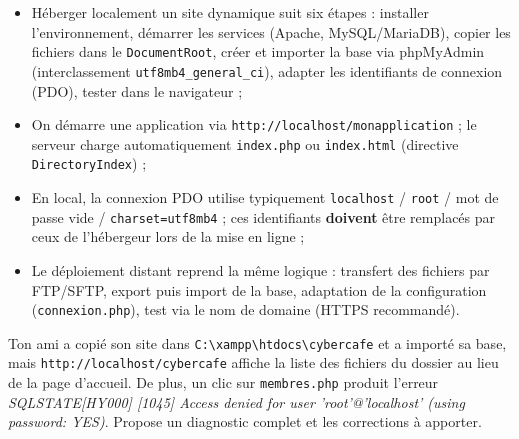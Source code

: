 \documentclass[11pt]{article}
\newcommand{\cle}[1]{{\popxbold\color{popdark}#1}}
\begin{document}
\begin{aretenir}
\begin{itemize}
  \item Héberger localement un site dynamique suit six étapes : installer l'environnement, démarrer les services (Apache, MySQL/MariaDB), copier les fichiers dans le \texttt{DocumentRoot}, créer et importer la base via phpMyAdmin (interclassement \texttt{utf8mb4\_general\_ci}), adapter les identifiants de connexion (PDO), tester dans le navigateur ;
  \item On démarre une application via \texttt{http://localhost/monapplication} ; le serveur charge automatiquement \texttt{index.php} ou \texttt{index.html} (directive \texttt{DirectoryIndex}) ;
  \item En local, la connexion PDO utilise typiquement \texttt{localhost} / \texttt{root} / mot de passe vide / \texttt{charset=utf8mb4} ; ces identifiants \textbf{doivent} être remplacés par ceux de l'hébergeur lors de la mise en ligne ;
  \item Le déploiement distant reprend la même logique : transfert des fichiers par \cle{FTP}/\cle{SFTP}, export puis import de la base, adaptation de la configuration (\texttt{connexion.php}), test via le nom de domaine (HTTPS recommandé).
\end{itemize}
\end{aretenir}

\begin{exercice}
Ton ami a copié son site dans \texttt{C:\textbackslash xampp\textbackslash htdocs\textbackslash cybercafe} et a importé sa base, mais \texttt{http://localhost/cybercafe} affiche la liste des fichiers du dossier au lieu de la page d'accueil. De plus, un clic sur \texttt{membres.php} produit l'erreur \emph{SQLSTATE[HY000] [1045] Access denied for user 'root'@'localhost' (using password: YES)}. Propose un diagnostic complet et les corrections à apporter.
\end{exercice}
\end{document}
